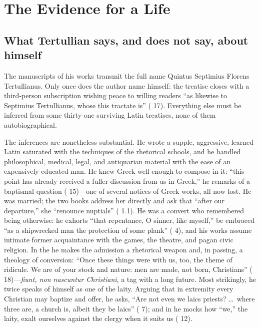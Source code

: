 \section{The Evidence for a Life}

\subsection{What Tertullian says, and does not say, about himself}

The manuscripts of his works transmit the full name Quintus Septimius Florens
Tertullianus. Only once does the author name himself: the treatise  closes with a third-person subscription wishing peace to
willing readers ``as likewise to Septimius Tertullianus, whose this tractate
is'' ( 17). Everything else must be inferred
from some thirty-one surviving Latin treatises, none of them autobiographical.

The inferences are nonetheless substantial. He wrote a supple, aggressive,
learned Latin saturated with the techniques of the rhetorical schools, and he
handled philosophical, medical, legal, and antiquarian material with the ease
of an expensively educated man. He knew Greek well enough to compose in it: ``this point has already received
a fuller discussion from us in Greek,'' he remarks of a baptismal question
( 15)---one of several notices of Greek works, all now lost. He was married; the two books  address her directly and ask that ``after our departure,'' she
``renounce nuptials'' ( 1.1). He was a convert who remembered
being otherwise: he exhorts ``that repentance, O sinner, like myself,'' be
embraced ``as a shipwrecked man the protection of some plank'' ( 4), and his works assume intimate former acquaintance with the
games, the theatre, and pagan civic religion. In the  he makes
the admission a rhetorical weapon and, in passing, a theology of conversion:
``Once these things were with us, too, the theme of ridicule. We are of your
stock and nature: men are made, not born, Christians'' (
18)---\textit{fiunt, non nascuntur Christiani}, a tag with a long future. Most strikingly, he twice speaks
of himself as one of the laity. Arguing that in extremity every Christian may
baptize and offer, he asks, ``Are not even we laics priests? \ldots\ where
three are, a church is, albeit they be laics'' ( 7); and in  he mocks how ``we,'' the laity, exalt
ourselves against the clergy when it suits us ( 12).

